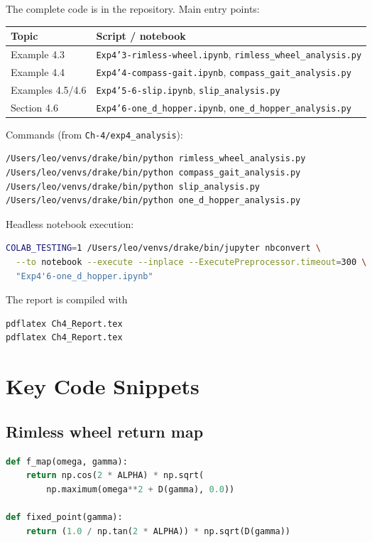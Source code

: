 \documentclass[11pt]{article}
\begin{document}
The complete code is in the repository.  Main entry points:
\begin{center}
\small
\begin{tabular}{ll}
\toprule
Topic & Script / notebook \\
\midrule
Example 4.3 & \texttt{Exp4'3-rimless-wheel.ipynb}, \texttt{rimless\_wheel\_analysis.py} \\
Example 4.4 & \texttt{Exp4'4-compass-gait.ipynb}, \texttt{compass\_gait\_analysis.py} \\
Examples 4.5/4.6 & \texttt{Exp4'5-6-slip.ipynb}, \texttt{slip\_analysis.py} \\
Section 4.6 & \texttt{Exp4'6-one\_d\_hopper.ipynb}, \texttt{one\_d\_hopper\_analysis.py} \\
\bottomrule
\end{tabular}
\end{center}

Commands (from \texttt{Ch-4/exp4\_analysis}):
\begin{lstlisting}[language=bash]
/Users/leo/venvs/drake/bin/python rimless_wheel_analysis.py
/Users/leo/venvs/drake/bin/python compass_gait_analysis.py
/Users/leo/venvs/drake/bin/python slip_analysis.py
/Users/leo/venvs/drake/bin/python one_d_hopper_analysis.py
\end{lstlisting}

Headless notebook execution:
\begin{lstlisting}[language=bash]
COLAB_TESTING=1 /Users/leo/venvs/drake/bin/jupyter nbconvert \
  --to notebook --execute --inplace --ExecutePreprocessor.timeout=300 \
  "Exp4'6-one_d_hopper.ipynb"
\end{lstlisting}

The report is compiled with
\begin{lstlisting}[language=bash]
pdflatex Ch4_Report.tex
pdflatex Ch4_Report.tex
\end{lstlisting}

\appendix
\section{Key Code Snippets}

\subsection{Rimless wheel return map}

\begin{lstlisting}[language=Python]
def f_map(omega, gamma):
    return np.cos(2 * ALPHA) * np.sqrt(
        np.maximum(omega**2 + D(gamma), 0.0))

def fixed_point(gamma):
    return (1.0 / np.tan(2 * ALPHA)) * np.sqrt(D(gamma))
\end{lstlisting}
\end{document}
